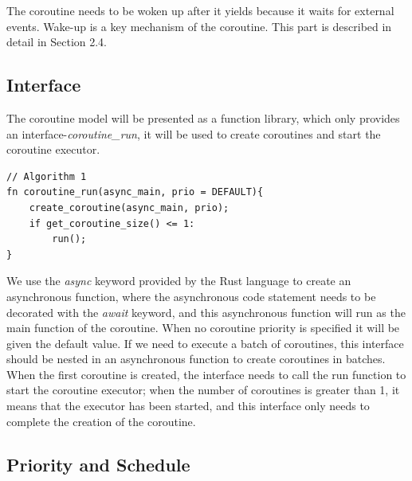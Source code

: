\documentclass[10pt]{article}
\begin{document}
The coroutine needs to be woken up after it yields because it waits for external events. Wake-up is a key mechanism of the coroutine. This part is described in detail in Section 2.4.


\subsection{Interface}
The coroutine model will be presented as a function library, which only provides an interface-\textit{coroutine\_run}, it will be used to create coroutines and start the coroutine executor.


\begin{lstlisting}
// Algorithm 1
fn coroutine_run(async_main, prio = DEFAULT){
    create_coroutine(async_main, prio);
    if get_coroutine_size() <= 1:
        run();
}
\end{lstlisting}

We use the \textit{async} keyword provided by the Rust language to create an asynchronous function, where the asynchronous code statement needs to be decorated with the \textit{await} keyword, and this asynchronous function will run as the main function of the coroutine. When no coroutine priority is specified it will be given the default value. If we need to execute a batch of coroutines, this interface should be nested in an asynchronous function to create coroutines in batches. When the first coroutine is created, the interface needs to call the run function to start the coroutine executor; when the number of coroutines is greater than 1, it means that the executor has been started, and this interface only needs to complete the creation of the coroutine.


\subsection{Priority and Schedule}
\end{document}
